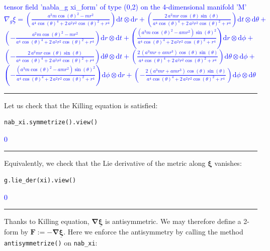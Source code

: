 \documentclass[a4paper]{jpconf}
\newcommand{\code}[1]{\texttt{#1}}
\newcommand{\w}[1]{\bm{#1}}
\newcommand{\soutput}[1]{\textcolor{blue}{#1}\\[-0.8ex]\rule{\textwidth}{0.4pt}}
\begin{document}
\soutput{tensor field 'nabla\_g xi\_form' of type (0,2) on the 4-dimensional
manifold 'M'\\[1ex]
$\nabla_{g} \underline{\xi} = \left( \frac{a^{2} m
\cos\left(\theta\right)^{2} - m r^{2}}{a^{4} \cos\left(\theta\right)^{4}
+ 2 \, a^{2} r^{2} \cos\left(\theta\right)^{2} + r^{4}} \right)
\mathrm{d} t\otimes \mathrm{d} r + \left( \frac{2 \, a^{2} m r
\cos\left(\theta\right) \sin\left(\theta\right)}{a^{4}
\cos\left(\theta\right)^{4} + 2 \, a^{2} r^{2}
\cos\left(\theta\right)^{2} + r^{4}} \right) \mathrm{d} t\otimes
\mathrm{d} \theta + $\\
$\left( -\frac{a^{2} m \cos\left(\theta\right)^{2} -
m r^{2}}{a^{4} \cos\left(\theta\right)^{4} + 2 \, a^{2} r^{2}
\cos\left(\theta\right)^{2} + r^{4}} \right) \mathrm{d} r\otimes
\mathrm{d} t + \left( \frac{{\left(a^{3} m \cos\left(\theta\right)^{2} -
a m r^{2}\right)} \sin\left(\theta\right)^{2}}{a^{4}
\cos\left(\theta\right)^{4} + 2 \, a^{2} r^{2}
\cos\left(\theta\right)^{2} + r^{4}} \right) \mathrm{d} r\otimes
\mathrm{d} \phi + $\\
$\left( -\frac{2 \, a^{2} m r \cos\left(\theta\right)
\sin\left(\theta\right)}{a^{4} \cos\left(\theta\right)^{4} + 2 \, a^{2}
r^{2} \cos\left(\theta\right)^{2} + r^{4}} \right) \mathrm{d}
\theta\otimes \mathrm{d} t + \left( \frac{2 \, {\left(a^{3} m r + a m
r^{3}\right)} \cos\left(\theta\right) \sin\left(\theta\right)}{a^{4}
\cos\left(\theta\right)^{4} + 2 \, a^{2} r^{2}
\cos\left(\theta\right)^{2} + r^{4}} \right) \mathrm{d} \theta\otimes
\mathrm{d} \phi + $ \\
$\left( -\frac{{\left(a^{3} m
\cos\left(\theta\right)^{2} - a m r^{2}\right)}
\sin\left(\theta\right)^{2}}{a^{4} \cos\left(\theta\right)^{4} + 2 \,
a^{2} r^{2} \cos\left(\theta\right)^{2} + r^{4}} \right) \mathrm{d}
\phi\otimes \mathrm{d} r + \left( -\frac{2 \, {\left(a^{3} m r + a m
r^{3}\right)} \cos\left(\theta\right) \sin\left(\theta\right)}{a^{4}
\cos\left(\theta\right)^{4} + 2 \, a^{2} r^{2}
\cos\left(\theta\right)^{2} + r^{4}} \right) \mathrm{d} \phi\otimes
\mathrm{d} \theta$}
Let us check that the Killing equation is satisfied:
\begin{verbatim}
nab_xi.symmetrize().view()
\end{verbatim}
\soutput{$0$}
Equivalently, we check that the Lie derivative of the metric along $\w{\xi}$
vanishes:
\begin{verbatim}
g.lie_der(xi).view()
\end{verbatim}
\soutput{$0$}
Thanks to Killing equation, $\w{\nabla} \underline{\w{\xi}}$ is antisymmetric. We may therefore define a 2-form by $\w{F}:= - \w{\nabla} \underline{\w{\xi}}$. Here we enforce the antisymmetry by calling the method \code{antisymmetrize()} on \code{nab\_xi}:
\end{document}
